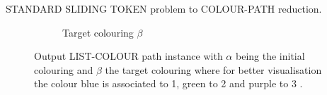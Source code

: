 \begin{example}{STANDARD SLIDING TOKEN problem to COLOUR-PATH reduction. \\}
\begin{figure}[H]
\begin{subfigure}[b]{0.9\textwidth}
\begin{scaletikzpicturetowidth}{\textwidth}
            \end{scaletikzpicturetowidth}
            \caption{Target colouring $\beta$}
            \label{fig:list_colour_2}
        \end{subfigure}
        \caption{Output LIST-COLOUR path instance with $\alpha$ being the initial colouring and $\beta$ the target colouring where for better
        visualisation the colour blue is associated to 1, green to 2 and purple to 3 .}
        \label{fig:output_instance_standard}
    \end{figure}
\end{example}